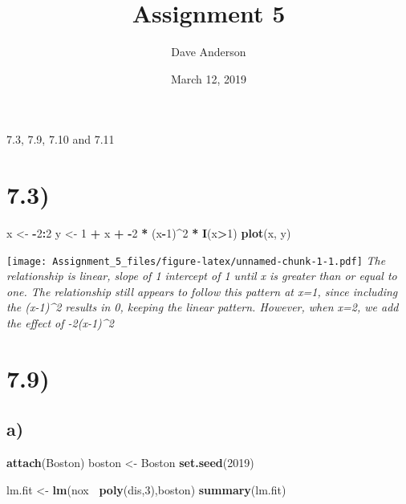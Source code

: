 \documentclass[]{article}
\title{Assignment 5}
\author{Dave Anderson}
\date{March 12, 2019}
\newenvironment{Shaded}{\begin{snugshade}}{\end{snugshade}}
\newcommand{\KeywordTok}[1]{\textcolor[rgb]{0.13,0.29,0.53}{\textbf{#1}}}
\newcommand{\DecValTok}[1]{\textcolor[rgb]{0.00,0.00,0.81}{#1}}
\newcommand{\StringTok}[1]{\textcolor[rgb]{0.31,0.60,0.02}{#1}}
\newcommand{\OperatorTok}[1]{\textcolor[rgb]{0.81,0.36,0.00}{\textbf{#1}}}
\newcommand{\NormalTok}[1]{#1}
\begin{document}
\maketitle

7.3, 7.9, 7.10 and 7.11

\section{7.3)}\label{section}

\begin{Shaded}
\begin{Highlighting}[]
\NormalTok{x <-}\StringTok{ }\OperatorTok{-}\DecValTok{2}\OperatorTok{:}\DecValTok{2}
\NormalTok{y <-}\StringTok{  }\DecValTok{1} \OperatorTok{+}\StringTok{ }\NormalTok{x }\OperatorTok{+}\StringTok{ }\OperatorTok{-}\DecValTok{2} \OperatorTok{*}\StringTok{ }\NormalTok{(x}\OperatorTok{-}\DecValTok{1}\NormalTok{)}\OperatorTok{^}\DecValTok{2} \OperatorTok{*}\StringTok{ }\KeywordTok{I}\NormalTok{(x}\OperatorTok{>}\DecValTok{1}\NormalTok{)}
\KeywordTok{plot}\NormalTok{(x, y)}
\end{Highlighting}
\end{Shaded}

\texttt{[image: Assignment\_5\_files/figure-latex/unnamed-chunk-1-1.pdf]}
\emph{The relationship is linear, slope of 1 intercept of 1 until x is
greater than or equal to one. The relationship still appears to follow
this pattern at x=1, since including the (x-1)\^{}2 results in 0,
keeping the linear pattern. However, when x=2, we add the effect of
-2(x-1)\^{}2}

\section{7.9)}\label{section-1}

\subsection{a)}\label{a}

\begin{Shaded}
\begin{Highlighting}[]
\KeywordTok{attach}\NormalTok{(Boston)}
\NormalTok{boston <-}\StringTok{ }\NormalTok{Boston}
\KeywordTok{set.seed}\NormalTok{(}\DecValTok{2019}\NormalTok{)}

\NormalTok{lm.fit <-}\StringTok{ }\KeywordTok{lm}\NormalTok{(nox }\OperatorTok{~}\KeywordTok{poly}\NormalTok{(dis,}\DecValTok{3}\NormalTok{),boston)}
\KeywordTok{summary}\NormalTok{(lm.fit)}
\end{Highlighting}
\end{Shaded}
\end{document}
